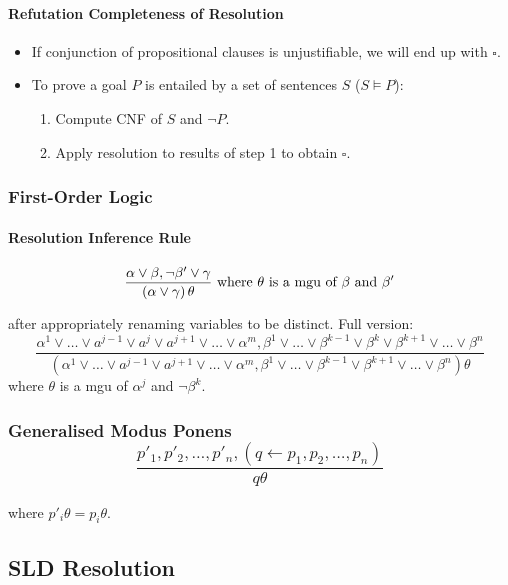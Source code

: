\documentclass[twocolumn,english]{article}
\begin{document}
\paragraph{Refutation Completeness of Resolution}
\begin{itemize}
\item If conjunction of propositional clauses is unjustifiable, we will
end up with $\square$.
\item To prove a goal $P$ is entailed by a set of sentences $S$ ($S\vDash P$):
\begin{enumerate}
\item Compute CNF of $S$ and $\lnot P$.
\item Apply resolution to results of step 1 to obtain $\square$.
\end{enumerate}
\end{itemize}

\subsubsection{First-Order Logic}

\paragraph{Resolution Inference Rule}

\[
\dfrac{\alpha\lor\beta,\lnot\beta'\lor\gamma}{\left(\alpha\lor\gamma\right)\theta}\text{ where \ensuremath{\theta} is a mgu of \ensuremath{\beta} and \ensuremath{\beta'}}
\]

after appropriately renaming variables to be distinct. Full version:
\[
\dfrac{\alpha^{1}\lor\dots\lor a^{j-1}\lor a^{j}\lor a^{j+1}\lor\dots\lor\alpha^{m},\beta^{1}\lor\dots\lor\beta^{k-1}\lor\beta^{k}\lor\beta^{k+1}\lor\dots\lor\beta^{n}}{\left(\alpha^{1}\lor\dots\lor a^{j-1}\lor a^{j+1}\lor\dots\lor\alpha^{m},\beta^{1}\lor\dots\lor\beta^{k-1}\lor\beta^{k+1}\lor\dots\lor\beta^{n}\right)\theta}
\]
where $\theta$ is a mgu of $\alpha^{j}$ and $\lnot\beta^{k}$.

\subsubsection{Generalised Modus Ponens
\[
\dfrac{p'_{1},p'_{2},\dots,p'_{n},\left(q\leftarrow p_{1},p_{2},\dots,p_{n}\right)}{q\theta}
\]
}

where $p'_{i}\theta=p_{i}\theta$.

\subsection{SLD Resolution}
\end{document}

